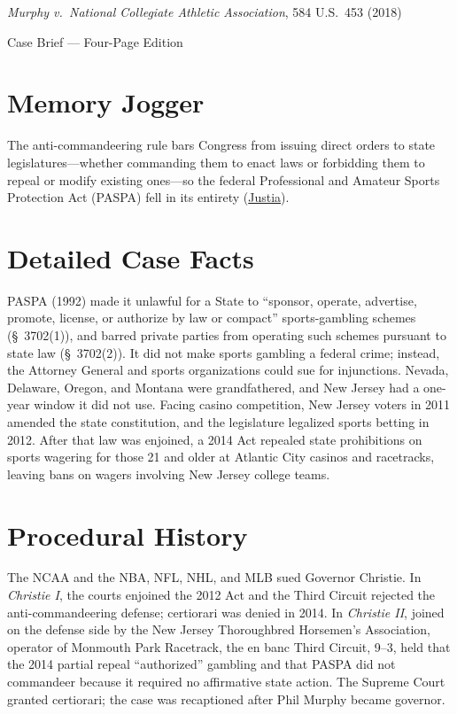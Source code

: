 \documentclass[12pt]{article}
\begin{document}
\begin{center}
{\LARGE \textit{Murphy v.\ National Collegiate Athletic Association}, 584 U.S.\ 453 (2018)\par}
\vspace{0.8em}
{\large Case Brief --- Four-Page Edition\par}
\end{center}
\vspace{1em}

\section{Memory Jogger}

The anti-commandeering rule bars Congress from issuing direct orders to state legislatures---whether commanding them to enact laws or forbidding them to repeal or modify existing ones---so the federal Professional and Amateur Sports Protection Act (PASPA) fell in its entirety (\href{https://supreme.justia.com/cases/federal/us/584/16-476/}{Justia}).

\section{Detailed Case Facts}

PASPA (1992) made it unlawful for a State to ``sponsor, operate, advertise, promote, license, or authorize by law or compact'' sports-gambling schemes (\S~3702(1)), and barred private parties from operating such schemes pursuant to state law (\S~3702(2)). It did not make sports gambling a federal crime; instead, the Attorney General and sports organizations could sue for injunctions. Nevada, Delaware, Oregon, and Montana were grandfathered, and New Jersey had a one-year window it did not use. Facing casino competition, New Jersey voters in 2011 amended the state constitution, and the legislature legalized sports betting in 2012. After that law was enjoined, a 2014 Act repealed state prohibitions on sports wagering for those 21 and older at Atlantic City casinos and racetracks, leaving bans on wagers involving New Jersey college teams.

\section{Procedural History}

The NCAA and the NBA, NFL, NHL, and MLB sued Governor Christie. In \textit{Christie I}, the courts enjoined the 2012 Act and the Third Circuit rejected the anti-commandeering defense; certiorari was denied in 2014. In \textit{Christie II}, joined on the defense side by the New Jersey Thoroughbred Horsemen's Association, operator of Monmouth Park Racetrack, the en banc Third Circuit, 9--3, held that the 2014 partial repeal ``authorized'' gambling and that PASPA did not commandeer because it required no affirmative state action. The Supreme Court granted certiorari; the case was recaptioned after Phil Murphy became governor.
\end{document}
